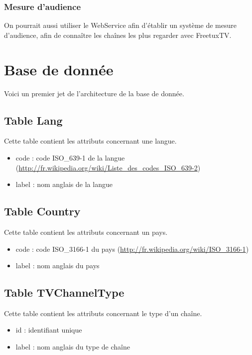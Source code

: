 \documentclass[10pt,a4paper]{article}
\begin{document}
\subsubsection{Mesure d'audience}

On pourrait aussi utiliser le WebService afin d'établir un système de mesure d'audience, afin de connaître les chaînes les plus regarder avec FreetuxTV.

\section{Base de donnée}

Voici un premier jet de l'architecture de la base de donnée.

\subsection{Table Lang}

Cette table contient les attributs concernant une langue.

\begin{itemize}
\item code : code ISO\_639-1 de la langue (\url{http://fr.wikipedia.org/wiki/Liste\_des\_codes\_ISO\_639-2})
\item label : nom anglais de la langue
\end{itemize}

\subsection{Table Country}

Cette table contient les attributs concernant un pays.

\begin{itemize}
\item code : code ISO\_3166-1 du pays (\url{http://fr.wikipedia.org/wiki/ISO\_3166-1})
\item label : nom anglais du pays
\end{itemize}

\subsection{Table TVChannelType}

Cette table contient les attributs concernant le type d'un chaîne.

\begin{itemize}
\item id : identifiant unique
\item label : nom anglais du type de chaîne
\end{itemize}
\end{document}
